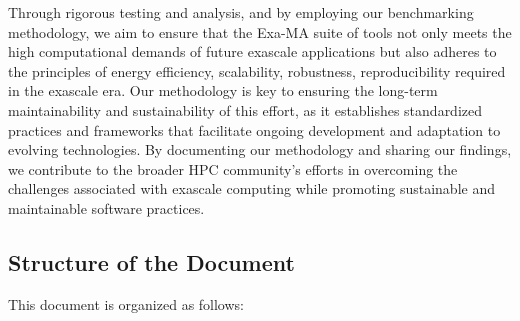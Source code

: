 Through rigorous testing and analysis, and by employing our  benchmarking methodology, we aim to ensure that the Exa-MA suite of tools not only meets the high computational demands of future exascale applications but also adheres to the principles of energy efficiency, scalability, robustness, reproducibility required in the exascale era. Our methodology is key to ensuring the long-term maintainability and sustainability of this effort, as it establishes standardized practices and frameworks that facilitate ongoing development and adaptation to evolving technologies. By documenting our methodology and sharing our findings, we contribute to the broader HPC community’s efforts in overcoming the challenges associated with exascale computing while promoting sustainable and maintainable software practices.


\subsection{Structure of the Document}
\label{sec:structure}

This document is organized as follows:

